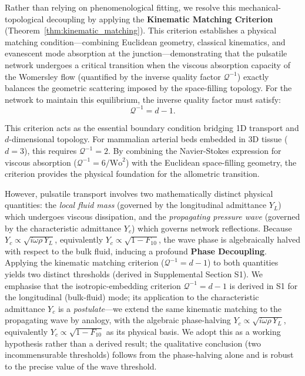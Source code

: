 Rather than relying on phenomenological fitting, we resolve this
mechanical-topological decoupling by applying the \textbf{Kinematic Matching
Criterion} (Theorem~\ref{thm:kinematic_matching}). This criterion establishes a
physical matching condition---combining Euclidean geometry, classical
kinematics, and evanescent mode absorption at the junction---demonstrating that
the pulsatile network undergoes a critical transition when the viscous
absorption capacity of the Womersley flow (quantified by the inverse quality
factor $\mathcal{Q}^{-1}$) exactly balances the geometric scattering imposed by
the space-filling topology. For the network to maintain this equilibrium, the
inverse quality factor must satisfy:
\begin{equation}
    \mathcal{Q}^{-1} = d - 1.
    \label{eq:isotropic_condition}
\end{equation}

This criterion acts as the essential boundary condition bridging 1D transport
and $d$-dimensional topology. For mammalian arterial beds embedded in 3D tissue
($d=3$), this requires $\mathcal{Q}^{-1} = 2$. By combining the Navier-Stokes
expression for viscous absorption ($\mathcal{Q}^{-1} = 6/\mathrm{Wo}^2$) with
the Euclidean space-filling geometry, the criterion provides the physical
foundation for the allometric transition.

However, pulsatile transport involves two mathematically distinct physical
quantities: the \emph{local fluid mass} (governed by the longitudinal admittance
$Y_L$) which undergoes viscous dissipation, and the \emph{propagating pressure
wave} (governed by the characteristic admittance $Y_c$) which governs
network reflections. Because $Y_c \propto \sqrt{i\omega\rho\,Y_L}$,
equivalently $Y_c\propto\sqrt{1-F_{10}}$, the wave phase is algebraically
halved with respect to the bulk fluid, inducing a profound \textbf{Phase
Decoupling}. Applying the kinematic matching criterion ($\mathcal{Q}^{-1} =
d-1$) to both quantities yields two distinct thresholds (derived in Supplemental
Section S1). We emphasise that the isotropic-embedding criterion
$\mathcal{Q}^{-1}=d-1$ is derived in S1 for the longitudinal (bulk-fluid) mode;
its application to the characteristic admittance $Y_c$ is a
\emph{postulate}---we extend the same kinematic matching to the propagating wave
by analogy, with the algebraic phase-halving
$Y_c\propto\sqrt{i\omega\rho\,Y_L}$, equivalently
$Y_c\propto\sqrt{1-F_{10}}$ as its physical basis. We adopt this as a working
hypothesis rather than a derived result; the qualitative conclusion (two
incommensurable thresholds) follows from the phase-halving alone and is robust
to the precise value of the wave threshold.

